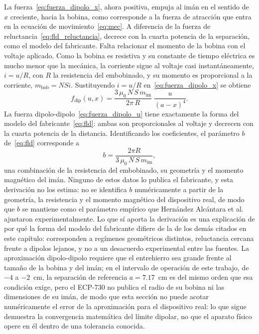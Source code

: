 La fuerza~\eqref{eq:fuerza_dipolo_x}, ahora positiva, empuja al imán en el sentido de $x$ creciente, hacia la bobina, como corresponde a la fuerza de atracción que entra en la ecuación de movimiento~\eqref{eq:mec}. A diferencia de la fuerza de reluctancia~\eqref{eq:fld_reluctancia}, decrece con la cuarta potencia de la separación, como el modelo del fabricante. Falta relacionar el momento de la bobina con el voltaje aplicado. Como la bobina es resistiva y su constante de tiempo eléctrica es mucho menor que la mecánica, la corriente sigue al voltaje casi instantáneamente, $i=u/R$, con $R$ la resistencia del embobinado, y su momento es proporcional a la corriente, $m_{\text{bob}}=NSi$. Sustituyendo $i=u/R$ en~\eqref{eq:fuerza_dipolo_x} se obtiene
\begin{equation}
f_{\text{dip}}(u,x) = \frac{3\,\mu_0\, N\, S\, m_{\text{im}}}{2\pi\, R}\;\frac{u}{(a-x)^4} .
\label{eq:fuerza_dipolo_u}
\end{equation}
La fuerza dipolo-dipolo~\eqref{eq:fuerza_dipolo_u} tiene exactamente la forma del modelo del fabricante~\eqref{eq:fld}: ambas son proporcionales al voltaje y decrecen con la cuarta potencia de la distancia. Identificando los coeficientes, el parámetro $b$ de~\eqref{eq:fld} corresponde a
\begin{equation}
b = \frac{2\pi R}{3\,\mu_0\, N\, S\, m_{\text{im}}} ,
\label{eq:b_primeros_principios}
\end{equation}
una combinación de la resistencia del embobinado, su geometría y el momento magnético del imán. Ninguno de estos datos lo publica el fabricante, y esta derivación no los estima: no se identifica $b$ numéricamente a partir de la geometría, la resistencia y el momento magnético del dispositivo real, de modo que $b$ se mantiene como el parámetro empírico que Hernández Alcántara et al.~\cite{alcantara} ajustaron experimentalmente. Lo que sí aporta la derivación es una explicación de por qué la forma del modelo del fabricante difiere de la de los demás citados en este capítulo: corresponden a regímenes geométricos distintos, reluctancia cercana frente a dipolos lejanos, y no a un desacuerdo experimental entre las fuentes. La aproximación dipolo-dipolo requiere que el entrehierro sea grande frente al tamaño de la bobina y del imán; en el intervalo de operación de este trabajo, de $-4$ a $-2$~cm, la separación de referencia $a=7.17$~cm es del mismo orden que esa condición exige, pero el ECP-730 no publica el radio de su bobina ni las dimensiones de su imán, de modo que esta sección no puede acotar numéricamente el error de la aproximación para el dispositivo real: lo que sigue demuestra la convergencia matemática del límite dipolar, no que el aparato físico opere en él dentro de una tolerancia conocida.

